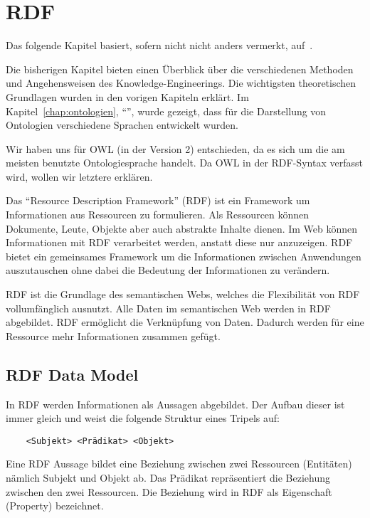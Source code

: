 \chapter{RDF}
\label{chap:rdf}
Das folgende Kapitel basiert, sofern nicht nicht anders vermerkt, auf~\cite{w3rdf}.

Die bisherigen Kapitel bieten einen Überblick über die verschiedenen Methoden und Angehensweisen des Knowledge-Engineerings. Die wichtigsten theoretischen Grundlagen wurden in den vorigen Kapiteln erklärt. Im Kapitel~\ref{chap:ontologien}, ``'', wurde gezeigt, dass für die Darstellung von Ontologien verschiedene Sprachen entwickelt wurden. 

Wir haben uns für OWL (in der Version 2) entschieden, da es sich um die am meisten benutzte Ontologiesprache handelt. Da OWL in der RDF-Syntax verfasst wird, wollen wir letztere erklären.

Das ``Resource Description Framework'' (RDF) ist ein Framework um Informationen aus Ressourcen zu formulieren. Als Ressourcen können Dokumente, Leute, Objekte aber auch abstrakte Inhalte dienen. Im Web können Informationen mit RDF verarbeitet werden, anstatt diese nur anzuzeigen. RDF bietet ein gemeinsames Framework um die Informationen zwischen Anwendungen auszutauschen ohne dabei die Bedeutung der Informationen zu verändern.

RDF ist die Grundlage des semantischen Webs, welches die Flexibilität von RDF vollumfänglich ausnutzt. Alle Daten im semantischen Web werden in RDF abgebildet. RDF ermöglicht die Verknüpfung von Daten. Dadurch werden für eine Ressource mehr Informationen zusammen gefügt.~\cite{cambSemRDF}

\section{RDF Data Model}
\label{sec:rdf_rdf_dataModel}
In RDF werden Informationen als Aussagen abgebildet. Der Aufbau dieser ist immer gleich und weist die folgende Struktur eines Tripels auf:

\begin{lstlisting}
    <Subjekt> <Prädikat> <Objekt>
\end{lstlisting}

Eine RDF Aussage bildet eine Beziehung zwischen zwei Ressourcen (Entitäten) nämlich Subjekt und Objekt ab. Das Prädikat repräsentiert die Beziehung zwischen den zwei Ressourcen. Die Beziehung wird in RDF als Eigenschaft (Property) bezeichnet.

